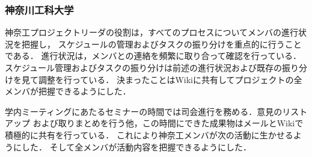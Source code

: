\subsubsection{神奈川工科大学}
\par 神奈工プロジェクトリーダの役割は，すべてのプロセスについてメンバの進行状況を把握し，
スケジュールの管理およびタスクの振り分けを重点的に行うことである．
進行状況は，メンバとの連絡を頻繁に取り合って確認を行っている．
スケジュール管理およびタスクの振り分けは前述の進行状況および既存の振り分けを見て調整を行っている．
決まったことはWikiに共有してプロジェクトの全メンバが把握できるようにした．
\par 学内ミーティングにあたるセミナーの時間では司会進行を務める．意見のリストアップ
および取りまとめを行う他，この時間にできた成果物はメールとWikiで積極的に共有を行っている．
これにより神奈工メンバが次の活動に生かせるようにした．
そして全メンバが活動内容を把握できるようにした．
